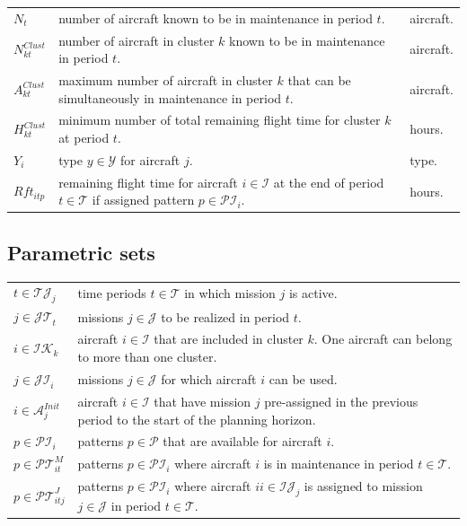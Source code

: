 \documentclass[a4paper,11pt]{article}
\begin{document}
        \begin{tabular}{p{15mm}p{125mm}p{15mm}}
            $N_t$               & number of aircraft known to be in maintenance in period $t$. & aircraft. \\
            $N^{Clust}_{kt}$    & number of aircraft in cluster $k$ known to be in maintenance in period $t$. & aircraft. \\
            $A^{Clust}_{kt}$    & maximum number of aircraft in cluster $k$ that can be simultaneously in maintenance in period $t$. & aircraft. \\
            $H^{Clust}_{kt}$    & minimum number of total remaining flight time for cluster $k$ at period $t$. & hours. \\
            $Y_i$               & type $y \in \mathcal{Y}$ for aircraft $j$. & type. \\
            $Rft_{itp}$           & remaining flight time for aircraft $i \in \mathcal{I}$ at the end of period $t \in \mathcal{T}$ if assigned pattern $p \in \mathcal{PI}_i$. & hours. \\
        \end{tabular}

    \subsection{Parametric sets}

        \begin{tabular}{p{20mm}p{135mm}}
          $t \in \mathcal{TJ}_j$     &  time periods $t \in \mathcal{T}$ in which mission $j$ is active. \\
          $j \in \mathcal{JT}_t$    &  missions $j \in \mathcal{J}$ to be realized in period $t$. \\
          $i \in \mathcal{IK}_k$     &  aircraft $i \in \mathcal{I}$ that are included in cluster $k$. One aircraft can belong to more than one cluster. \\
          $j \in \mathcal{JI}_i$     &  missions $j \in \mathcal{J}$ for which aircraft $i$ can be used. \\
          $i \in \mathcal{A}^{Init}_j$  & aircraft $i \in \mathcal{I}$ that have mission $j$ pre-assigned in the previous period to the start of the planning horizon. \\
          $p \in \mathcal{PI}_i$     &  patterns $p \in \mathcal{P}$ that are available for aircraft $i$. \\
          $p \in \mathcal{PT}^{M}_{it}$     &  patterns $p \in \mathcal{PI}_i$ where aircraft $i$ is in maintenance in period $t \in \mathcal{T}$. \\
          $p \in \mathcal{PT}^{J}_{itj}$     &  patterns $p \in \mathcal{PI}_i$ where aircraft $i i \in \mathcal{IJ}_j$ is assigned to mission $j \in \mathcal{J}$ in period $t \in \mathcal{T}$. \\
        \end{tabular}
\end{document}
